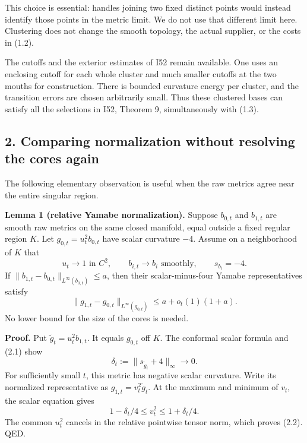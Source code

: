 \documentclass[
  10pt,
]{article}
\begin{document}
This choice is essential: handles joining two fixed distinct points
would instead identify those points in the metric limit. We do not use
that different limit here. Clustering does not change the smooth
topology, the actual supplier, or the costs in (1.2).

The cutoffs and the exterior estimates of I52 remain available. One uses
an enclosing cutoff for each whole cluster and much smaller cutoffs at
the two mouths for construction. There is bounded curvature energy per
cluster, and the transition errors are chosen arbitrarily small. Thus
these clustered bases can satisfy all the selections in I52, Theorem 9,
simultaneously with (1.3).

\hypertarget{comparing-normalization-without-resolving-the-cores-again}{%
\subsection{2. Comparing normalization without resolving the cores
again}\label{comparing-normalization-without-resolving-the-cores-again}}

The following elementary observation is useful when the raw metrics
agree near the entire singular region.

\textbf{Lemma 1 (relative Yamabe normalization).} Suppose \(b_{0,t}\)
and \(b_{1,t}\) are smooth raw metrics on the same closed manifold,
equal outside a fixed regular region \(K\). Let \(g_{0,t}=u_t^2b_{0,t}\)
have scalar curvature \(-4\). Assume on a neighborhood of \(K\) that \[
 u_t\longrightarrow1\text{ in }C^2,\qquad
 b_{i,t}\longrightarrow b_i\text{ smoothly},\qquad s_{b_i}=-4.
                                                               \tag{2.1}
\] If \(\|b_{1,t}-b_{0,t}\|_{L^\infty(b_{0,t})}\le a\), then their
scalar-minus-four Yamabe representatives satisfy \[
 \|g_{1,t}-g_{0,t}\|_{L^\infty(g_{0,t})}\le a+o_t(1)(1+a).       \tag{2.2}
\] No lower bound for the size of the cores is needed.

\textbf{Proof.} Put \(\widetilde g_t=u_t^2b_{1,t}\). It equals
\(g_{0,t}\) off \(K\). The conformal scalar formula and (2.1) show \[
 \delta_t:=\|s_{\widetilde g_t}+4\|_\infty\longrightarrow0.
\] For sufficiently small \(t\), this metric has negative scalar
curvature. Write its normalized representative as
\(g_{1,t}=v_t^2\widetilde g_t\). At the maximum and minimum of \(v_t\),
the scalar equation gives \[
 1-\delta_t/4\le v_t^2\le1+\delta_t/4.                         \tag{2.3}
\] The common \(u_t^2\) cancels in the relative pointwise tensor norm,
which proves (2.2). QED.
\end{document}
